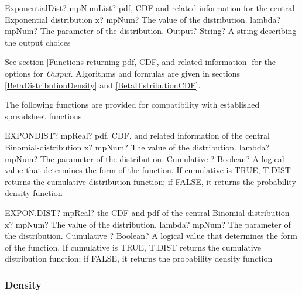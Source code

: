 \begin{mpFunctionsExtract}
	\mpFunctionThreeNotImplemented
	{ExponentialDist? mpNumList? pdf, CDF and related information for the central Exponential distribution}
	{x? mpNum? The value of the distribution.}
	{lambda? mpNum? The parameter of the distribution.}
	{Output? String? A string describing the output choices}
\end{mpFunctionsExtract}


\vspace{0.3cm}
See section \ref{Functions returning pdf, CDF, and related information} for the options for {\itshape\sffamily Output}. Algorithms and formulas are given in sections \ref{BetaDistributionDensity} and \ref{BetaDistributionCDF}.



\vspace{0.3cm}

The following functions are provided for compatibility with established spreadsheet functions

\vspace{0.6cm}
\begin{mpFunctionsExtract}
	\mpWorksheetFunctionThreeNotImplemented
	{EXPONDIST? mpReal? pdf, CDF, and related information of the central Binomial-distribution}
	{x? mpNum? The value of the distribution.}
	{lambda? mpNum? The parameter of the distribution.}
	{Cumulative ? Boolean? A logical value that determines the form of the function. If cumulative is TRUE, T.DIST returns the cumulative distribution function; if FALSE, it returns the probability density function}
\end{mpFunctionsExtract}


\vspace{0.6cm}
\begin{mpFunctionsExtract}
	\mpWorksheetFunctionThreeNotImplemented
	{EXPON.DIST? mpReal? the CDF and pdf of the central Binomial-distribution}
	{x? mpNum? The value of the distribution.}
	{lambda? mpNum? The parameter of the distribution.}
	{Cumulative ? Boolean? A logical value that determines the form of the function. If cumulative is TRUE, T.DIST returns the cumulative distribution function; if FALSE, it returns the probability density function}
\end{mpFunctionsExtract}



\subsubsection{Density}
\label{ExponentialDistributionDensity}

